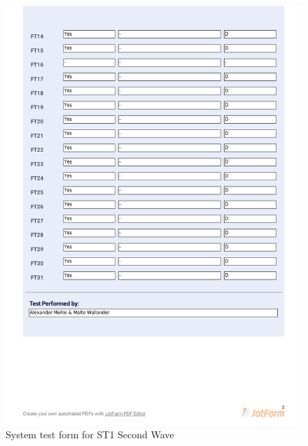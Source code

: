 \documentclass{article}
\begin{document}
 \begin{figure}
     \centering
     \includegraphics[width=13cm]{images/2021-03-08_Alexander_ST1-2}
     \renewcommand\figurename{Figure}
     \caption{System test form for ST1 Second Wave}
     \label{fig:my_label}
 \end{figure}
 
\end{document}
